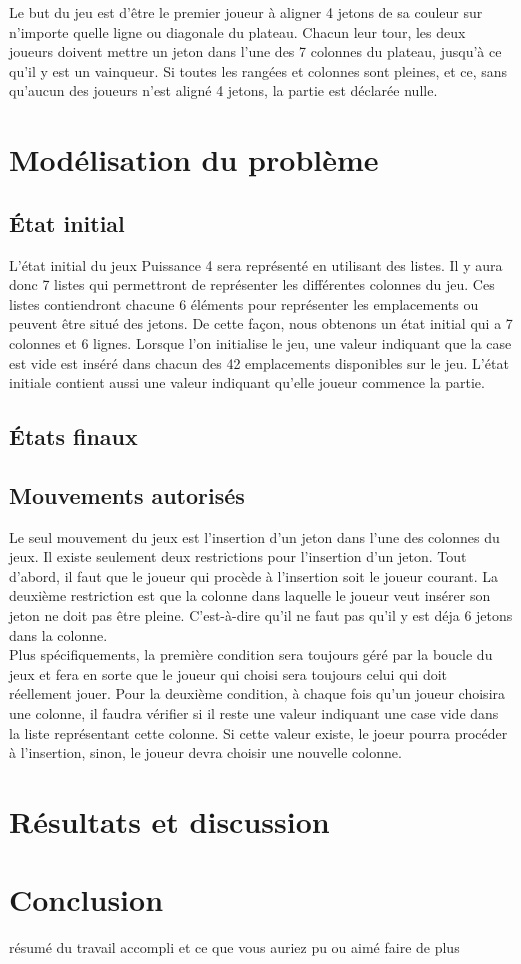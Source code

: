 \documentclass[12pt]{article}
\begin{document}
Le but du jeu est d'être le premier joueur à aligner 4 jetons de sa couleur sur n'importe quelle ligne ou diagonale du plateau. Chacun leur tour, les deux joueurs doivent mettre un jeton dans l'une des 7 colonnes du plateau, jusqu'à ce qu'il y est un vainqueur. Si toutes les rangées et colonnes sont pleines, et ce, sans qu'aucun des joueurs n'est aligné 4 jetons, la partie est déclarée nulle.

\section*{Modélisation du problème}

\subsection*{État initial}
L'état initial du jeux Puissance 4 sera représenté en utilisant des listes. Il y aura donc 7 listes qui permettront de représenter les différentes colonnes du jeu. Ces listes contiendront chacune 6 éléments pour représenter les emplacements ou peuvent être situé des jetons. De cette façon, nous obtenons un état initial qui a 7 colonnes et 6 lignes. Lorsque l’on initialise le jeu, une valeur indiquant que la case est vide est inséré dans chacun des 42 emplacements disponibles sur le jeu. L’état initiale contient aussi une valeur indiquant qu’elle joueur commence la partie.

\subsection*{États finaux}

\subsection*{Mouvements autorisés}
Le seul mouvement du jeux est l'insertion d'un jeton dans l'une des colonnes du jeux. Il existe seulement deux restrictions pour l'insertion d'un jeton. Tout d'abord, il faut que le joueur qui procède à l'insertion soit le joueur courant. La deuxième restriction est que la colonne dans laquelle le joueur veut insérer son jeton ne doit pas être pleine. C'est-à-dire qu'il ne faut pas qu'il y est déja 6 jetons dans la colonne. \\

Plus spécifiquements, la première condition sera toujours géré par la boucle du jeux  et fera en sorte que le joueur qui choisi sera toujours celui qui doit réellement jouer. Pour la deuxième condition, à chaque fois qu'un joueur choisira une colonne, il faudra vérifier si il reste une valeur indiquant une case vide dans la liste représentant cette colonne. Si cette valeur existe, le joeur pourra procéder à l'insertion, sinon, le joueur devra choisir une nouvelle colonne. 

\section*{Résultats et discussion}

\section*{Conclusion}
résumé du travail accompli et ce que vous auriez pu ou aimé faire de plus
\end{document}
